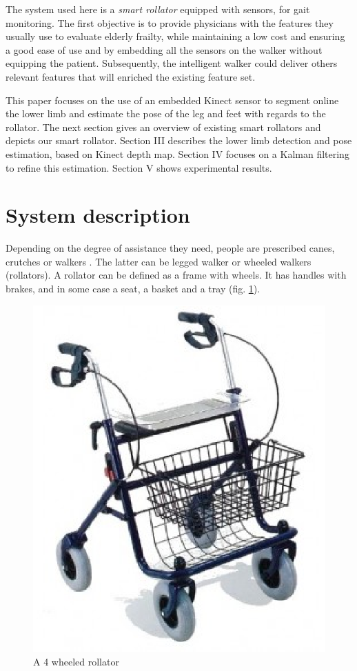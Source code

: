 \documentclass[letterpaper, 10 pt, conference]{ieeeconf}
\newcommand{\CJOK}[2]{{#1}} %
\begin{document}
The system used here is a \textit{smart rollator} equipped with sensors, for gait monitoring. The first objective is to provide physicians with the features they usually use to evaluate elderly frailty, while maintaining a low cost  and ensuring a good ease of use and by embedding all the sensors on the walker without equipping the patient. Subsequently, the intelligent walker could deliver others relevant features that will enriched the existing feature set. 

This paper focuses on the use of an embedded Kinect sensor to segment online the lower limb and estimate the pose of the leg and feet with regards to the rollator. The next section gives an overview of existing smart rollators and depicts our smart rollator. Section III describes the lower limb detection and pose estimation, based on Kinect depth map. Section IV focuses on a Kalman filtering to refine this estimation. Section V shows experimental results. 

\section{System description}

Depending on the degree of assistance they need, people are prescribed canes, crutches or walkers \cite{Joyce91}. The latter can be legged walker or wheeled walkers (rollators). A rollator can be defined as a frame with wheels. It has handles with brakes, and in some case a seat, a basket and a tray (\CJOK{}{see }fig. \ref{fig:rollator}).

\begin{figure}[h]
	\centering
	\includegraphics[width=0.45\columnwidth]{images/rollator.eps}
	\caption{A 4 wheeled rollator}
	\label{fig:rollator}
\end{figure}

\end{document}
